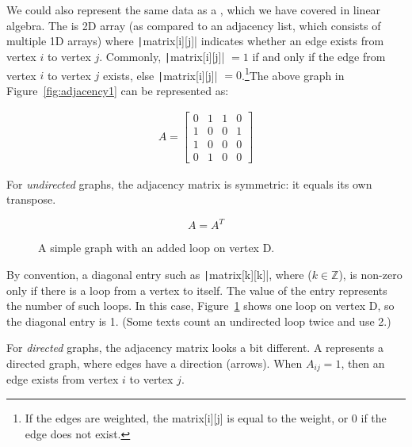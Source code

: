 We could also represent the same data as a , which we have covered in linear algebra. The  is 2D array (as compared to an adjacency list, which consists of multiple 1D arrays) where \texttt|matrix[i][j]| indicates whether an edge exists from vertex $i$ to vertex $j$. Commonly, \texttt|matrix[i][j]| $=1$ if and only if the edge from vertex $i$ to vertex $j$ exists, else \texttt|matrix[i][j]| $=0$.\footnote{If the edges are weighted, the matrix[i][j] is equal to the weight, or 0 if the edge does not exist.}The above graph in Figure~\ref{fig:adjacency1} can be represented as:

$$\begin{array}{c} A=
		\begin{bmatrix}
			0 & 1 & 1 & 0 \\
			1 & 0 & 0 & 1 \\
			1 & 0 & 0 & 0 \\
			0 & 1 & 0 & 0
		\end{bmatrix}\end{array}$$

For \emph{undirected} graphs, the adjacency matrix is symmetric: it equals its own transpose.

$$A = A^T$$
\begin{figure}[H]
	\centering

	\caption{A simple graph with an added loop on vertex D.}
	\label{fig:adjacency2}
\end{figure}
By convention, a diagonal entry such as \texttt|matrix[k][k]|, where ($k \in \mathbb{Z}$), is non-zero only if there is a loop from a vertex to itself. The value of the entry represents the number of such loops. In this case, Figure~\ref{fig:adjacency2} shows one loop on vertex D, so the diagonal entry is 1. (Some texts count an undirected loop twice and use 2.)

For \emph{directed} graphs, the adjacency matrix looks a bit different. A  represents a directed graph, where edges have a direction (arrows). When $A_{ij} = 1$, then an edge exists from vertex $i$ to vertex $j$.


